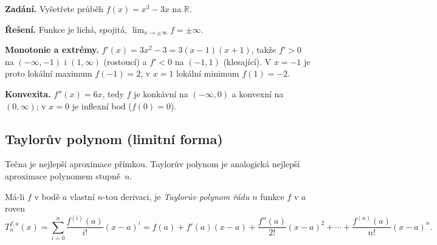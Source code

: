 \documentclass[11pt,a4paper]{article}
\begin{document}
\begin{priklad}
\textbf{Zadání.} Vyšetřete průběh $f(x)=x^3-3x$ na $\mathbb{R}$.

\textbf{Řešení.}
Funkce je lichá, spojitá, $\lim_{x\to\pm\infty}f=\pm\infty$.\par
\textbf{Monotonie a extrémy.} $f'(x)=3x^2-3=3(x-1)(x+1)$, takže $f'>0$ na $(-\infty,-1)$ i $(1,\infty)$ (rostoucí) a $f'<0$ na $(-1,1)$ (klesající). V $x=-1$ je proto lokální maximum $f(-1)=2$, v $x=1$ lokální minimum $f(1)=-2$.\par
\textbf{Konvexita.} $f''(x)=6x$, tedy $f$ je konkávní na $(-\infty,0)$ a konvexní na $(0,\infty)$; v $x=0$ je inflexní bod ($f(0)=0$).
\begin{center}
\end{center}
\end{priklad}

\subsection{Taylorův polynom (limitní forma)}

Tečna je nejlepší aproximace přímkou. Taylorův polynom je analogická nejlepší aproximace polynomem stupně~$n$.

\begin{definice}
Má-li $f$ v bodě $a$ vlastní $n$-tou derivaci, je \emph{Taylorův polynom řádu $n$} funkce $f$ v $a$ roven
\[
  T_n^{f,a}(x)=\sum_{i=0}^{n}\frac{f^{(i)}(a)}{i!}(x-a)^i
  =f(a)+f'(a)(x-a)+\frac{f''(a)}{2!}(x-a)^2+\cdots+\frac{f^{(n)}(a)}{n!}(x-a)^n.
\]
\end{definice}
\end{document}

